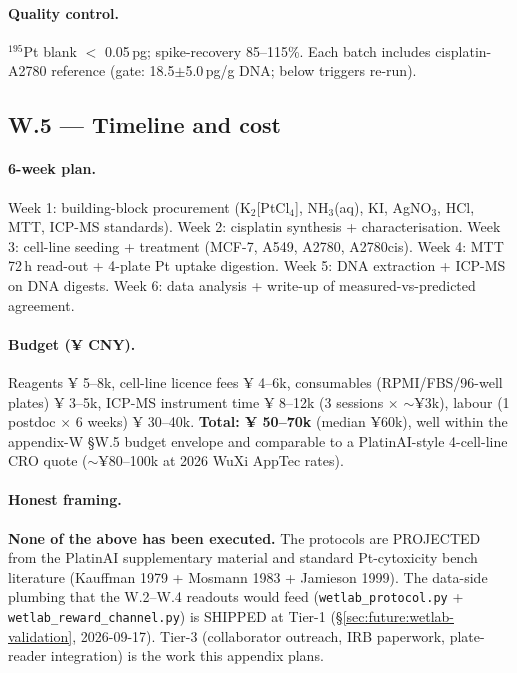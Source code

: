 \paragraph{Quality control.}
$^{195}$Pt blank $<$ 0.05\,pg; spike-recovery 85--115\%.
Each batch includes cisplatin-A2780 reference (gate:
18.5$\pm$5.0\,pg/\textmu g DNA; below triggers re-run).

\subsection{W.5 --- Timeline and cost}
\label{appendix:W-cost}

\paragraph{6-week plan.}
Week 1: building-block procurement (K$_2$[PtCl$_4$],
NH$_3$(aq), KI, AgNO$_3$, HCl, MTT, ICP-MS standards).
Week 2: cisplatin synthesis + characterisation.
Week 3: cell-line seeding + treatment (MCF-7, A549, A2780,
A2780cis).  Week 4: MTT 72\,h read-out + 4-plate Pt
uptake digestion.  Week 5: DNA extraction + ICP-MS on
DNA digests.  Week 6: data analysis + write-up of
measured-vs-predicted agreement.

\paragraph{Budget (¥ CNY).}
Reagents ¥ 5--8k, cell-line licence fees ¥ 4--6k,
consumables (RPMI/FBS/96-well plates) ¥ 3--5k,
ICP-MS instrument time ¥ 8--12k (3 sessions $\times$
$\sim$¥3k), labour (1 postdoc $\times$ 6 weeks) ¥ 30--40k.
\textbf{Total: ¥ 50--70k} (median ¥60k), well within the
appendix-W §W.5 budget envelope and comparable to a
PlatinAI-style 4-cell-line CRO quote ($\sim$¥80--100k at
2026 WuXi AppTec rates).

\paragraph{Honest framing.}
\textbf{None of the above has been executed.}  The
protocols are PROJECTED from the PlatinAI supplementary
material and standard Pt-cytoxicity bench literature
(Kauffman 1979 + Mosmann 1983 + Jamieson 1999).  The
data-side plumbing that the W.2--W.4 readouts would
feed (\texttt{wetlab\_protocol.py} +
\texttt{wetlab\_reward\_channel.py}) is SHIPPED at Tier-1
(\S\ref{sec:future:wetlab-validation}, 2026-09-17).
Tier-3 (collaborator outreach, IRB paperwork,
plate-reader integration) is the work this appendix plans.

\endinput